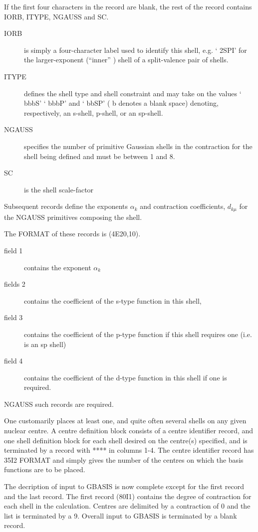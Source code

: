 If the first four characters in the record are blank, the rest of
the record 
contains IORB, ITYPE, NGAUSS and SC. 
\begin{description}
\item[IORB] is simply a four-character label used to identify this
shell, e.g. ` 2SPI' for the larger-exponent (``inner'' )
shell of a split-valence pair of shells.
\item[ITYPE]
defines the shell type and shell constraint and may take on the values
` bbbS' ` bbbP'  and ` bbSP' ( b denotes a blank space) 
denoting, respectively,
an s-shell, p-shell, or an sp-shell. 
\item[NGAUSS] specifies the number of primitive
Gaussian shells in the contraction for the shell being defined and must
be between 1 and 8.  
\item[SC] is the shell scale-factor  
\end{description}
Subsequent records define the exponents $\alpha_k$ and contraction
coefficients, $d_{k\mu}$ for the NGAUSS primitives composing the shell.

The FORMAT of these records is (4E20,10). 
\begin{description}
\item[field 1] contains the exponent $\alpha_k$ 
\item[fields 2] contains the coefficient of the s-type function
in this shell,
\item[field 3] contains the coefficient of the p-type function
if this shell requires one (i.e. is an sp shell)
\item[field 4] contains the coefficient of the d-type function
in this shell if one is required.
\end{description}
NGAUSS such records are required.

One customarily places at least one, and quite often several shells on any
given nuclear centre.  
A centre definition block consists of a centre identifier
record, and one shell definition block for each shell desired on the centre(s)
specified, and is terminated by a record with  **** in columns 1-4. The centre
identifier record has 35I2 FORMAT and simply gives the number of the centres
on which the basis functions are to be placed.

The decription of input to GBASIS is now complete except for the first record
and the last record.  The first record (80I1) contains the degree of
contraction for each shell in the calculation.  Centres are delimited
by a contraction of 0 and the list is terminated by a 9.  Overall input
to GBASIS is terminated by a blank record.
\newpage
